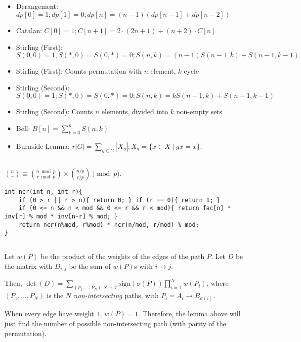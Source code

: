\documentclass[landscape, 8pt, a4paper, oneside, twocolumn]{extarticle}
\begin{document}
\subsection{}
\begin{itemize}
	\item Derangement: $dp[0] = 1; dp[1] = 0; dp[n] = (n-1)(dp[n-1] + dp[n-2])$
	\item Catalan: $C[0] = 1; C[n+1] = 2 \cdot (2n+1) \div (n+2) \cdot C[n]$
	\item Stirling (First): $S(0, 0) = 1, S(*, 0) = S(0, *) = 0; S(n, k) = (n-1) S(n-1, k) + S(n-1, k-1)$
	\item Stirling (First): Counts permutation with $n$ element, $k$ cycle
	\item Stirling (Second): $S(0, 0) = 1; S(*, 0) = S(0, *) = 0; S(n, k) = kS(n-1, k) + S(n-1, k-1)$
	\item Stirling (Second): Counts $n$ elements, divided into $k$ non-empty sets
	\item Bell: $B[n] = \sum\limits_{k=0}^{n} S(n, k)$
	\item Burnside Lemma: $r|G| = \sum_{g \in G} |X_g|; X_g = \{x \in X \mid gx = x\}$.
\end{itemize}
\subsection{}
$\binom{n}{r} \equiv \binom{n \bmod p}{r \bmod p} \times \binom{n/p}{r/p} \pmod p$.
\begin{verbatim}
int ncr(int n, int r){
	if (0 > r || r > n){ return 0; } if (r == 0){ return 1; }
	if (0 <= n && n < mod && 0 <= r && r < mod){ return fac[n] * inv[r] % mod * inv[n-r] % mod; }
	return ncr(n%mod, r%mod) * ncr(n/mod, r/mod) % mod;
}
\end{verbatim}
\subsection{}
Let $w(P)$ be the product of the weights of the edges of the path $P$. Let $D$ be the matrix with $D_{i,j}$ be the sum of $w(P)$s with $i \to j$.

Then, $\det(D) = \sum_{(P_1, \ldots, P_N) \colon S \to T} \mathrm{sign}(\sigma(P)) \prod_{i=1}^{N} w(P_i)$, where $(P_1, \ldots, P_N)$ is the $N$ \textit{non-intersecting} paths, with $P_i = A_i \to B_{\sigma(i)}$.

When every edge have weight $1$, $w(P) = 1$. Therefore, the lemma above will just find the number of possible non-intersecting path (with parity of the permutation).
\end{document}
